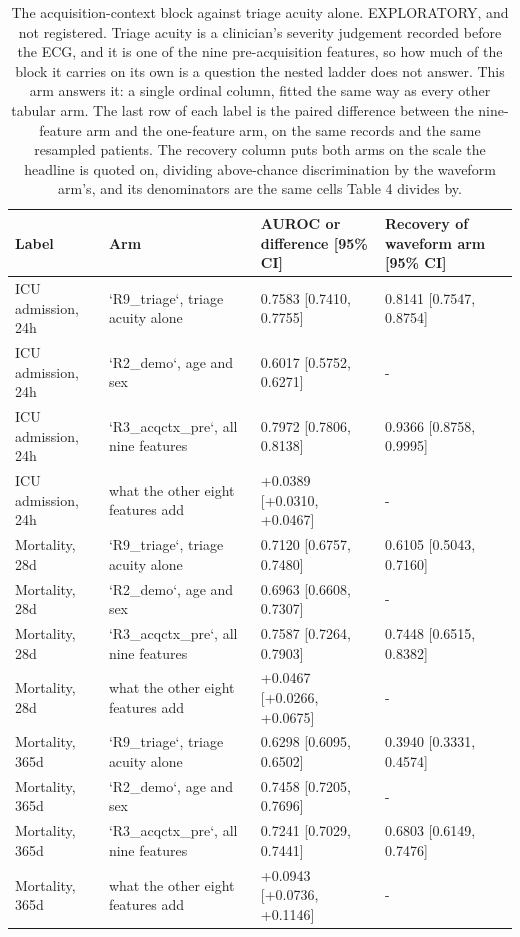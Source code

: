 \begin{table}[t]
\centering
\small
\caption{The acquisition-context block against triage acuity alone. EXPLORATORY, and not registered. Triage acuity is a clinician's severity judgement recorded before the ECG, and it is one of the nine pre-acquisition features, so how much of the block it carries on its own is a question the nested ladder does not answer. This arm answers it: a single ordinal column, fitted the same way as every other tabular arm. The last row of each label is the paired difference between the nine-feature arm and the one-feature arm, on the same records and the same resampled patients. The recovery column puts both arms on the scale the headline is quoted on, dividing above-chance discrimination by the waveform arm's, and its denominators are the same cells Table 4 divides by.}
\label{tab:triage}
\begin{tabular}{llll}
\toprule
Label & Arm & AUROC or difference [95\% CI] & Recovery of waveform arm [95\% CI] \\
\midrule
ICU admission, 24h & `R9\_triage`, triage acuity alone & 0.7583 [0.7410, 0.7755] & 0.8141 [0.7547, 0.8754] \\
ICU admission, 24h & `R2\_demo`, age and sex & 0.6017 [0.5752, 0.6271] & - \\
ICU admission, 24h & `R3\_acqctx\_pre`, all nine features & 0.7972 [0.7806, 0.8138] & 0.9366 [0.8758, 0.9995] \\
ICU admission, 24h & what the other eight features add & +0.0389 [+0.0310, +0.0467] & - \\
Mortality, 28d & `R9\_triage`, triage acuity alone & 0.7120 [0.6757, 0.7480] & 0.6105 [0.5043, 0.7160] \\
Mortality, 28d & `R2\_demo`, age and sex & 0.6963 [0.6608, 0.7307] & - \\
Mortality, 28d & `R3\_acqctx\_pre`, all nine features & 0.7587 [0.7264, 0.7903] & 0.7448 [0.6515, 0.8382] \\
Mortality, 28d & what the other eight features add & +0.0467 [+0.0266, +0.0675] & - \\
Mortality, 365d & `R9\_triage`, triage acuity alone & 0.6298 [0.6095, 0.6502] & 0.3940 [0.3331, 0.4574] \\
Mortality, 365d & `R2\_demo`, age and sex & 0.7458 [0.7205, 0.7696] & - \\
Mortality, 365d & `R3\_acqctx\_pre`, all nine features & 0.7241 [0.7029, 0.7441] & 0.6803 [0.6149, 0.7476] \\
Mortality, 365d & what the other eight features add & +0.0943 [+0.0736, +0.1146] & - \\

\end{tabular}
\end{table}
